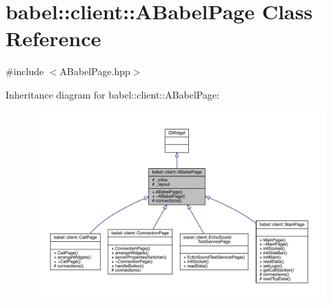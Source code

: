 \hypertarget{classbabel_1_1client_1_1_a_babel_page}{}\section{babel\+:\+:client\+:\+:A\+Babel\+Page Class Reference}
\label{classbabel_1_1client_1_1_a_babel_page}


{\ttfamily \#include $<$A\+Babel\+Page.\+hpp$>$}



Inheritance diagram for babel\+:\+:client\+:\+:A\+Babel\+Page\+:\nopagebreak
\begin{figure}[H]
\begin{center}
\leavevmode
\includegraphics[width=350pt]{classbabel_1_1client_1_1_a_babel_page__inherit__graph}
\end{center}
\end{figure}


